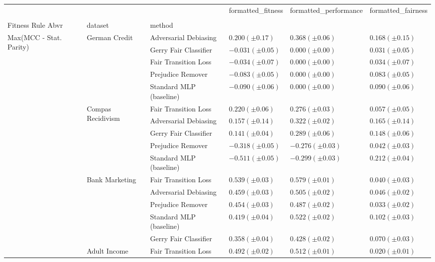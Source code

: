 \begin{tabular}{llllll}
\toprule
 &  &  & formatted_fitness & formatted_performance & formatted_fairness \\
 &  &  &  &  &  \\
Fitness Rule Abvr & dataset & method &  &  &  \\
\midrule
\multirow[t]{20}{*}{Max(MCC - Stat. Parity)} & \multirow[t]{5}{*}{German Credit} & Adversarial Debiasing & $0.200 (\pm0.17)$ & $0.368 (\pm0.06)$ & $0.168 (\pm0.15)$ \\
 &  & Gerry Fair Classifier & $-0.031 (\pm0.05)$ & $0.000 (\pm0.00)$ & $0.031 (\pm0.05)$ \\
 &  & Fair Transition Loss & $-0.034 (\pm0.07)$ & $0.000 (\pm0.00)$ & $0.034 (\pm0.07)$ \\
 &  & Prejudice Remover & $-0.083 (\pm0.05)$ & $0.000 (\pm0.00)$ & $0.083 (\pm0.05)$ \\
 &  & Standard MLP (baseline) & $-0.090 (\pm0.06)$ & $0.000 (\pm0.00)$ & $0.090 (\pm0.06)$ \\
\cline{2-6}
 & \multirow[t]{5}{*}{Compas Recidivism} & Fair Transition Loss & $0.220 (\pm0.06)$ & $0.276 (\pm0.03)$ & $0.057 (\pm0.05)$ \\
 &  & Adversarial Debiasing & $0.157 (\pm0.14)$ & $0.322 (\pm0.02)$ & $0.165 (\pm0.14)$ \\
 &  & Gerry Fair Classifier & $0.141 (\pm0.04)$ & $0.289 (\pm0.06)$ & $0.148 (\pm0.06)$ \\
 &  & Prejudice Remover & $-0.318 (\pm0.05)$ & $-0.276 (\pm0.03)$ & $0.042 (\pm0.03)$ \\
 &  & Standard MLP (baseline) & $-0.511 (\pm0.05)$ & $-0.299 (\pm0.03)$ & $0.212 (\pm0.04)$ \\
\cline{2-6}
 & \multirow[t]{5}{*}{Bank Marketing} & Fair Transition Loss & $0.539 (\pm0.03)$ & $0.579 (\pm0.01)$ & $0.040 (\pm0.03)$ \\
 &  & Adversarial Debiasing & $0.459 (\pm0.03)$ & $0.505 (\pm0.02)$ & $0.046 (\pm0.02)$ \\
 &  & Prejudice Remover & $0.454 (\pm0.03)$ & $0.487 (\pm0.02)$ & $0.033 (\pm0.02)$ \\
 &  & Standard MLP (baseline) & $0.419 (\pm0.04)$ & $0.522 (\pm0.02)$ & $0.102 (\pm0.03)$ \\
 &  & Gerry Fair Classifier & $0.358 (\pm0.04)$ & $0.428 (\pm0.02)$ & $0.070 (\pm0.03)$ \\
\cline{2-6}
 & \multirow[t]{5}{*}{Adult Income} & Fair Transition Loss & $0.492 (\pm0.02)$ & $0.512 (\pm0.01)$ & $0.020 (\pm0.01)$ \\

\end{tabular}
